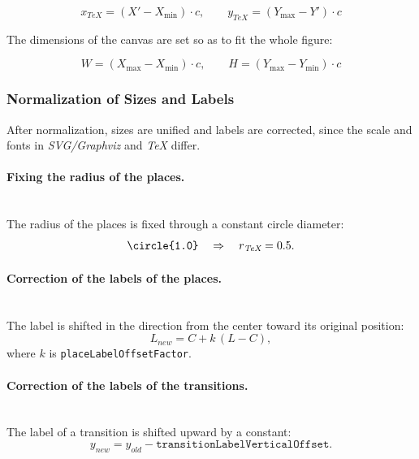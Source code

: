 \vspace{-0.2cm}

\begin{equation}
	x_{\textit{TeX}} = (X' - X_{\min})\cdot c,\qquad
	y_{\textit{TeX}} = (Y_{\max} - Y')\cdot c
	\label{eq:tex-normalization}
\end{equation}

The dimensions of the canvas are set so as to fit the whole figure:

\vspace{-0.2cm}

\begin{equation}
	W = (X_{\max}-X_{\min})\cdot c,\qquad
	H = (Y_{\max}-Y_{\min})\cdot c
	\label{eq:picture-dimensions}
\end{equation}

\subsubsection{Normalization of Sizes and Labels}
\hspace*{2.5em}After normalization, sizes are unified and labels are corrected, since the scale and fonts in \textit{SVG/Graphviz} and \textit{TeX} differ.

\paragraph{Fixing the radius of the places.}
\mbox{}\\
The radius of the places is fixed through a constant circle diameter:
\begin{equation}
	\text{\texttt{\textbackslash circle\{1.0\}}} \quad \Rightarrow \quad r_{\textit{TeX}} = 0.5.
	\label{eq:fixed-place-radius}
\end{equation}

\paragraph{Correction of the labels of the places.}
\mbox{}\\
The label is shifted in the direction from the center toward its original position:
\begin{equation}
	L_{\textit{new}} = C + k\,(L-C),
	\label{eq:place-label-shift}
\end{equation}
where $k$ is \texttt{placeLabelOffsetFactor}.

\paragraph{Correction of the labels of the transitions.}
\mbox{}\\
The label of a transition is shifted upward by a constant:
\begin{equation}
	y_{\textit{new}} = y_{\textit{old}} - \texttt{transitionLabelVerticalOffset}.
	\label{eq:transition-label-offset}
\end{equation}

